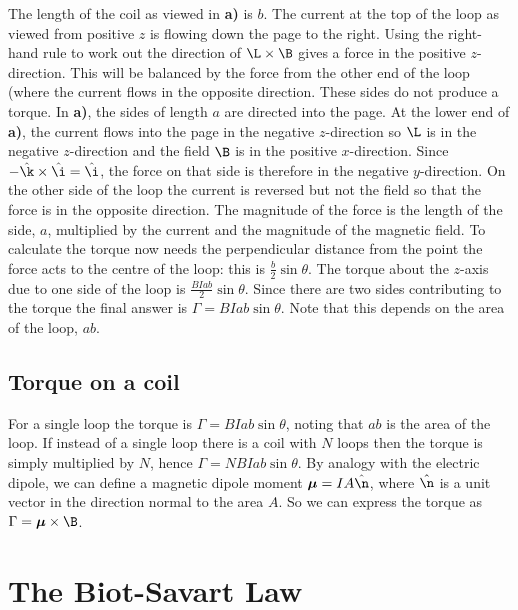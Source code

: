 \documentclass[
]{book}
\theoremstyle{definition}
\theoremstyle{definition}
\theoremstyle{definition}
\theoremstyle{definition}
\theoremstyle{remark}
\begin{document}
The length of the coil as viewed in \textbf{a)} is \(b\). The current at the
top of the loop as viewed from positive \(z\) is flowing down the page to
the right. Using the right-hand rule to work out the direction of
\(\L \times \B\) gives a force in the positive \(z\)-direction. This will be
balanced by the force from the other end of the loop (where the current
flows in the opposite direction. These sides do not produce a torque. In
\textbf{a)}, the sides of length \(a\) are directed into the page. At the lower
end of \textbf{a)}, the current flows into the page in the negative
\(z\)-direction so \(\L\) is in the negative \(z\)-direction and the field
\(\B\) is in the positive \(x\)-direction. Since
\(-\hat{\k} \times \hat{\i} = \hat{\i}\), the force on that side is
therefore in the negative \(y\)-direction. On the other side of the loop
the current is reversed but not the field so that the force is in the
opposite direction. The magnitude of the force is the length of the
side, \(a\), multiplied by the current and the magnitude of the magnetic
field. To calculate the torque now needs the perpendicular distance from
the point the force acts to the centre of the loop: this is
\(\frac{b}{2}\sin\theta\). The torque about the \(z\)-axis due to one side
of the loop is \(\frac{BIab}{2} \sin \theta\). Since there are two sides
contributing to the torque the final answer is
\(\Gamma = BIab \sin\theta\). Note that this depends on the area of the
loop, \(ab\).

\hypertarget{torque-on-a-coil}{%
\subsection{Torque on a coil}\label{torque-on-a-coil}}

For a single loop the torque is \(\Gamma = BIab \sin\theta\), noting that
\(ab\) is the area of the loop. If instead of a single loop there is a
coil with \(N\) loops then the torque is simply multiplied by \(N\), hence
\(\Gamma = NBIab \sin\theta\). By analogy with the electric dipole, we can
define a magnetic dipole moment \(\boldsymbol{\mu} = IA \hat{\n}\), where
\(\hat{\n}\) is a unit vector in the direction normal to the area \(A\). So
we can express the torque as \(\Gamma = \boldsymbol{\mu} \times \B\).

\hypertarget{the-biot-savart-law}{%
\section{The Biot-Savart Law}\label{the-biot-savart-law}}
\end{document}
